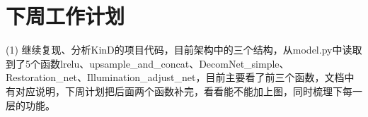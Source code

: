 \documentclass[letterpaper,12pt]{article}
\begin{document}
%			
%		
%		
%					
%			
%			
%		
%			
%			
	
	
	\section{下周工作计划}
	
	(1) 继续复现、分析KinD的项目代码，目前架构中的三个结构，从model.py中读取到了5个函数lrelu、upsample\_and\_concat、DecomNet\_simple、Restoration\_net、Illumination\_adjust\_net，目前主要看了前三个函数，文档中有对应说明，下周计划把后面两个函数补完，看看能不能加上图，同时梳理下每一层的功能。
	
\end{document}
